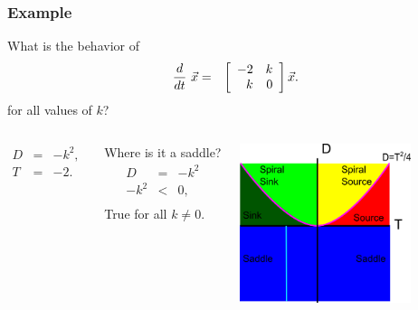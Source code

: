 \begin{frame}
  \frametitle{Example}

  What is the behavior of
  \begin{eqnarray*}
    \deriv{~}{t} \vec{x} & = & \arrayTwo{-2}{k}{k}{0} \vec{x}.
  \end{eqnarray*}
  for all values of $k$?

  \begin{columns}
     {
      \begin{eqnarray*}
        D & = & -k^2, \\
        T & = & -2.
      \end{eqnarray*}
    }

     { Where is it a saddle?
      \begin{eqnarray*}
        D & = & -k^2 \\
        -k^2 & < & 0, \\ 
      \end{eqnarray*}
      True for all $k\neq 0$.  }


     {
      \centerline{\includegraphics[width=5cm]{img/traceDeterminantExample4}}
    }

  \end{columns}

\end{frame}


